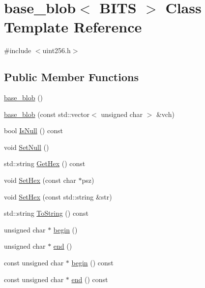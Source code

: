 \hypertarget{classbase__blob}{}\section{base\+\_\+blob$<$ B\+I\+TS $>$ Class Template Reference}
\label{classbase__blob}


{\ttfamily \#include $<$uint256.\+h$>$}

\subsection*{Public Member Functions}
\begin{DoxyCompactItemize}
\item 
\mbox{\hyperlink{classbase__blob_ada7be83089951dc9438f384c0587cf29}{base\+\_\+blob}} ()
\item 
\mbox{\hyperlink{classbase__blob_a874bc08d9039eb202fb2ab95dd9f49a0}{base\+\_\+blob}} (const std\+::vector$<$ unsigned char $>$ \&vch)
\item 
bool \mbox{\hyperlink{classbase__blob_aba89c6722866a5850882a509d27d7bbd}{Is\+Null}} () const
\item 
void \mbox{\hyperlink{classbase__blob_aa340be5328d911272eded433d03f30a3}{Set\+Null}} ()
\item 
std\+::string \mbox{\hyperlink{classbase__blob_ad7263503f949fb3c6c520ebb1f28e378}{Get\+Hex}} () const
\item 
void \mbox{\hyperlink{classbase__blob_a5ec1f681a2830f4e180fe664c0eb4dd0}{Set\+Hex}} (const char $\ast$psz)
\item 
void \mbox{\hyperlink{classbase__blob_a5df0a1d46bdf167b4e2dc7c7068ff53a}{Set\+Hex}} (const std\+::string \&str)
\item 
std\+::string \mbox{\hyperlink{classbase__blob_a7a0d25782830d8b087c4da839f3ccdeb}{To\+String}} () const
\item 
unsigned char $\ast$ \mbox{\hyperlink{classbase__blob_aeee68e00ceeacf49086e98b661e017ff}{begin}} ()
\item 
unsigned char $\ast$ \mbox{\hyperlink{classbase__blob_ab60d34d18e5b5f74d285480f7b3db00c}{end}} ()
\item 
const unsigned char $\ast$ \mbox{\hyperlink{classbase__blob_a7411db7de7bd5f396ff304de4e41a754}{begin}} () const
\item 
const unsigned char $\ast$ \mbox{\hyperlink{classbase__blob_aebe1b6351e492a8f488bffda9608b8ad}{end}} () const
\item 

\end{DoxyCompactItemize}
